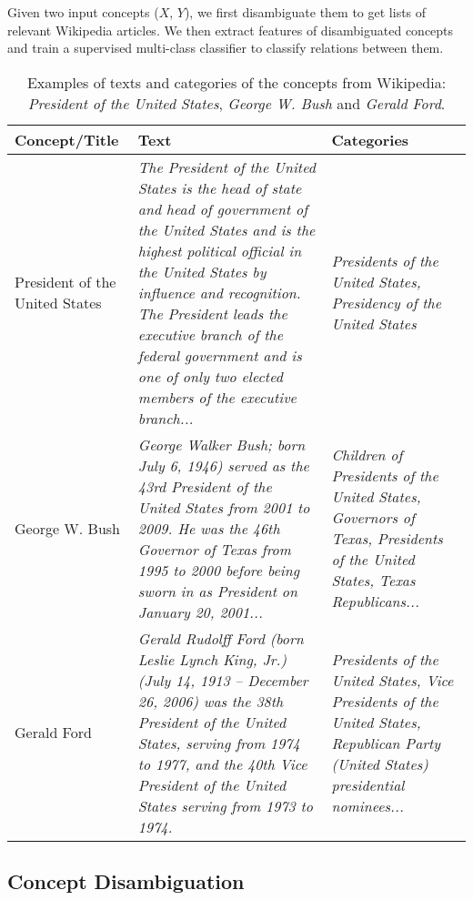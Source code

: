 Given two input concepts ($X$, $Y$), we first disambiguate them to get
lists of relevant Wikipedia articles. We then extract features of
disambiguated concepts and train a supervised multi-class classifier
to classify relations between them.

\begin{table*}[!t]
  \tiny
  \centering
  \begin{tabular}{|p{1.0in}|p{3.5in}|p{2.0in}|}
    \hline
    {\bf Concept/Title} & {\bf Text} & {\bf Categories} \\
    \hline
    \hline
    President of the United States & \textit{The President of the United States is the head of state and head of government of the United States and is the highest political official in the United States by influence and recognition. The President leads the executive branch of the federal government and is one of only two elected members of the executive branch...} & \textit{Presidents of the United States, Presidency of the United States} \\
    \hline
    George W. Bush & \textit{George Walker Bush; born July 6, 1946) served as the 43rd President of the United States from 2001 to 2009. He was the 46th Governor of Texas from 1995 to 2000 before being sworn in as President on January 20, 2001...} & \textit{Children of Presidents of the United States, Governors of Texas, Presidents of the United States, Texas Republicans...} \\
    \hline
    Gerald Ford & \textit{Gerald Rudolff Ford (born Leslie Lynch King, Jr.) (July 14, 1913 – December 26, 2006) was the 38th President of the United States, serving from 1974 to 1977, and the 40th Vice President of the United States serving from 1973 to 1974.} & \textit{Presidents of the United States, Vice Presidents of the United States, Republican Party (United States) presidential nominees...} \\
    \hline
  \end{tabular}
  \caption{Examples of texts and categories of the concepts from Wikipedia: {\em President of the United States}, {\em George W. Bush} and {\em Gerald Ford}.}
  \label{tab:snippets}
\end{table*}

\subsection{Concept Disambiguation}
\label{sec:conc-disamb}


